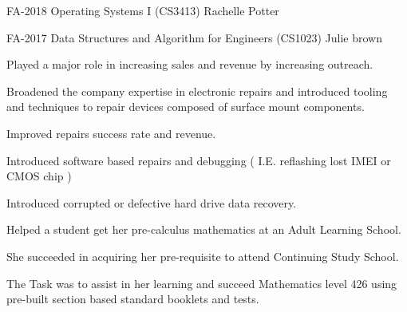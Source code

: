 \documentclass[]{deedy-resume-openfont}
\begin{document}
\begin{flushleft}
\begin{samepage}
\vspace{\topsep} %
\begin{tightemize}
\item FA-2018 Operating Systems I (CS3413) Rachelle Potter
\item FA-2017 Data Structures and Algorithm for Engineers (CS1023) Julie brown
\end{tightemize}
\sectionsep
\end{samepage}

\clearpage


\begin{samepage}
\vspace{\topsep} %
\begin{tightemize}
\item Played a major role in increasing sales and revenue by increasing outreach.
\item Broadened the company expertise in electronic repairs and introduced tooling and techniques to repair devices composed of surface mount components.
\item Improved repairs success rate and revenue.
\item Introduced software based repairs and debugging ( I.E. reflashing lost IMEI or CMOS chip )
\item Introduced corrupted or defective hard drive data recovery.
\end{tightemize}
\sectionsep
\end{samepage}

\begin{samepage}
\vspace{\topsep} %
\begin{tightemize}
\item Helped a student get her pre-calculus mathematics at an Adult Learning School.
\item She succeeded in acquiring her pre-requisite to attend Continuing Study School.
\item The Task was to assist in her learning and succeed Mathematics level 426 using pre-built section based standard booklets and tests.
\end{tightemize}
\sectionsep
\end{samepage}


\end{flushleft}
\end{document}
